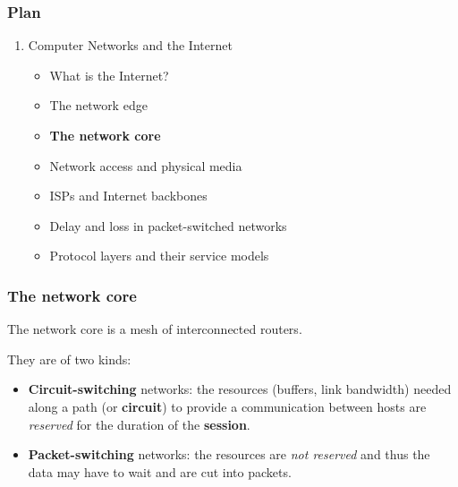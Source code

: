 
%
\begin{frame}
\frametitle{Plan}

\begin{enumerate}

  \item Computer Networks and the Internet

    \begin{itemize}

      \item What is the Internet?

      \item The network edge

      \item \textbf{The network core}

      \item Network access and physical media

      \item ISPs and Internet backbones

      \item Delay and loss in packet-switched networks

      \item Protocol layers and their service models

    \end{itemize}

\end{enumerate}

\end{frame}

%
\begin{frame}
\frametitle{The network core}

The network core is a mesh of interconnected routers.

\bigskip

They are of two kinds:
\begin{itemize}

  \item \textbf{Circuit-switching} networks: the resources (buffers,
    link bandwidth) needed along a path (or \textbf{circuit}) to
    provide a communication between hosts are \emph{reserved} for the
    duration of the \textbf{session}.

  \item \textbf{Packet-switching} networks: the resources are
    \emph{not reserved} and thus the data may have to wait and are cut
    into packets.

\end{itemize}

\end{frame}

